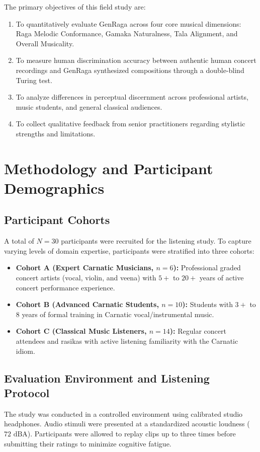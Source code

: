 \documentclass[conference,letterpaper]{IEEEtran}
\begin{document}
The primary objectives of this field study are:
\begin{enumerate}
    \item To quantitatively evaluate GenRaga across four core musical dimensions: Raga Melodic Conformance, Gamaka Naturalness, Tala Alignment, and Overall Musicality.
    \item To measure human discrimination accuracy between authentic human concert recordings and GenRaga synthesized compositions through a double-blind Turing test.
    \item To analyze differences in perceptual discernment across professional artists, music students, and general classical audiences.
    \item To collect qualitative feedback from senior practitioners regarding stylistic strengths and limitations.
\end{enumerate}

\section{Methodology and Participant Demographics}
\subsection{Participant Cohorts}
A total of $N=30$ participants were recruited for the listening study. To capture varying levels of domain expertise, participants were stratified into three cohorts:
\begin{itemize}
    \item \textbf{Cohort A (Expert Carnatic Musicians, $n=6$):} Professional graded concert artists (vocal, violin, and veena) with $5+$ to $20+$ years of active concert performance experience.
    \item \textbf{Cohort B (Advanced Carnatic Students, $n=10$):} Students with $3+$ to $8$ years of formal training in Carnatic vocal/instrumental music.
    \item \textbf{Cohort C (Classical Music Listeners, $n=14$):} Regular concert attendees and rasikas with active listening familiarity with the Carnatic idiom.
\end{itemize}

\subsection{Evaluation Environment and Listening Protocol}
The study was conducted in a controlled environment using calibrated studio headphones. Audio stimuli were presented at a standardized acoustic loudness ($72 \text{ dBA}$). Participants were allowed to replay clips up to three times before submitting their ratings to minimize cognitive fatigue.
\end{document}
